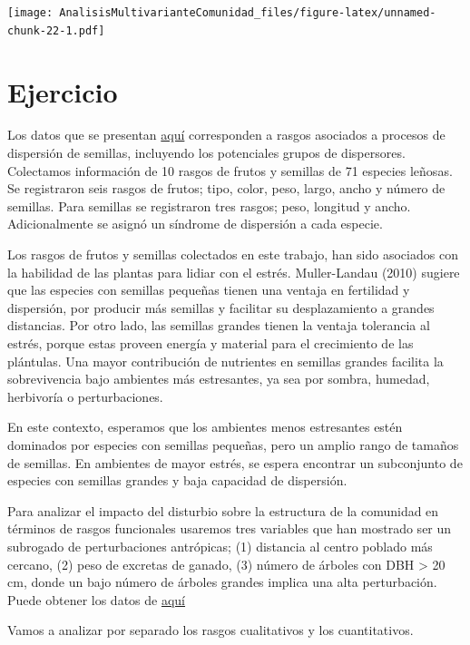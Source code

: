 \documentclass[]{book}
\begin{document}
\texttt{[image: AnalisisMultivarianteComunidad\_files/figure-latex/unnamed-chunk-22-1.pdf]}

\chapter{Ejercicio}\label{ejercicio}

Los datos que se presentan
\href{\%22https://github.com/Ciespinosa/AnalisisMultivariante/TraitsVege.csv\%22}{aquí}
corresponden a rasgos asociados a procesos de dispersión de semillas,
incluyendo los potenciales grupos de dispersores. Colectamos información
de 10 rasgos de frutos y semillas de 71 especies leñosas. Se registraron
seis rasgos de frutos; tipo, color, peso, largo, ancho y número de
semillas. Para semillas se registraron tres rasgos; peso, longitud y
ancho. Adicionalmente se asignó un síndrome de dispersión a cada
especie.

Los rasgos de frutos y semillas colectados en este trabajo, han sido
asociados con la habilidad de las plantas para lidiar con el estrés.
Muller-Landau (2010) sugiere que las especies con semillas pequeñas
tienen una ventaja en fertilidad y dispersión, por producir más semillas
y facilitar su desplazamiento a grandes distancias. Por otro lado, las
semillas grandes tienen la ventaja tolerancia al estrés, porque estas
proveen energía y material para el crecimiento de las plántulas. Una
mayor contribución de nutrientes en semillas grandes facilita la
sobrevivencia bajo ambientes más estresantes, ya sea por sombra,
humedad, herbivoría o perturbaciones.

En este contexto, esperamos que los ambientes menos estresantes estén
dominados por especies con semillas pequeñas, pero un amplio rango de
tamaños de semillas. En ambientes de mayor estrés, se espera encontrar
un subconjunto de especies con semillas grandes y baja capacidad de
dispersión.

Para analizar el impacto del disturbio sobre la estructura de la
comunidad en términos de rasgos funcionales usaremos tres variables que
han mostrado ser un subrogado de perturbaciones antrópicas; (1)
distancia al centro poblado más cercano, (2) peso de excretas de ganado,
(3) número de árboles con DBH \textgreater{} 20 cm, donde un bajo número
de árboles grandes implica una alta perturbación. Puede obtener los
datos de
\href{\%22https://github.com/Ciespinosa/AnalisisMultivariante/Parcelas.csv\%22}{aquí}

Vamos a analizar por separado los rasgos cualitativos y los
cuantitativos.
\end{document}
